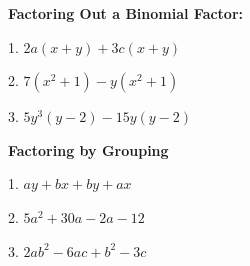 \documentclass[12pt]{article}
\begin{document}
\textbf{\large Factoring Out a Binomial Factor:}

\vspace{1.5em}

1. $2a(x+y)+3c(x+y)$

\vspace{5.5em}

2. $7(x^{2}+1)-y(x^{2}+1)$

\vspace{5.5em}

3. $5y^3(y - 2) - 15y(y - 2)$

\vspace{5.5em}

\textbf{\large Factoring by Grouping}

\vspace{1.5em}

1. $ay+bx+by+ax$

\vspace{5.5em}

2. $5a^{2}+30a-2a-12$

\vspace{5.5em}

3. $2ab^{2}-6ac+b^{2}-3c$
\end{document}
